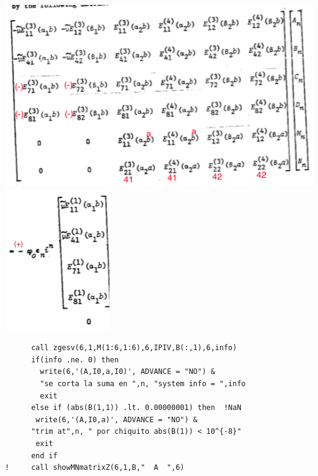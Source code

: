 \documentclass [11pt,spanish]{article}
\begin{document}
\endgroup
\includegraphics[scale=0.6]{matriz}
\includegraphics[scale=0.6]{termindep}
\begingroup
\fontsize{10pt}{12pt}
\selectfont
{}
\begin{shaded}
\begin{verbatim}
      call zgesv(6,1,M(1:6,1:6),6,IPIV,B(:,1),6,info)
      if(info .ne. 0) then
        write(6,'(A,I0,a,I0)', ADVANCE = "NO") &
        "se corta la suma en ",n, "system info = ",info
        exit
      else if (abs(B(1,1)) .lt. 0.00000001) then  !NaN
       write(6,'(A,I0,a)', ADVANCE = "NO") &
      "trim at",n, " por chiquito abs(B(1)) < 10^{-8}"
       exit
      end if
!     call showMNmatrixZ(6,1,B,"  A  ",6)
\end{verbatim}
\end{shaded}
\endgroup
\end{document}
